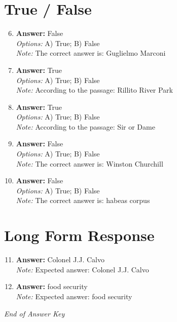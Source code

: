 \documentclass[12pt]{article}
\begin{document}
\section*{True / False}
\begin{enumerate}[label=\arabic*.]
\setcounter{enumi}{5}
\item \textbf{Answer:} False
\\ \textit{Options:} A) True; B) False
\\ \textit{Note:} The correct answer is: Guglielmo Marconi
\item \textbf{Answer:} True
\\ \textit{Options:} A) True; B) False
\\ \textit{Note:} According to the passage: Rillito River Park
\item \textbf{Answer:} True
\\ \textit{Options:} A) True; B) False
\\ \textit{Note:} According to the passage: Sir or Dame
\item \textbf{Answer:} False
\\ \textit{Options:} A) True; B) False
\\ \textit{Note:} The correct answer is: Winston Churchill
\item \textbf{Answer:} False
\\ \textit{Options:} A) True; B) False
\\ \textit{Note:} The correct answer is: habeas corpus
\end{enumerate}

\section*{Long Form Response}
\begin{enumerate}[label=\arabic*.]
\setcounter{enumi}{10}
\item \textbf{Answer:} Colonel J.J. Calvo
\\ \textit{Note:} Expected answer: Colonel J.J. Calvo
\item \textbf{Answer:} food security
\\ \textit{Note:} Expected answer: food security
\end{enumerate}

\vfill
\noindent\textit{End of Answer Key}
\end{document}
